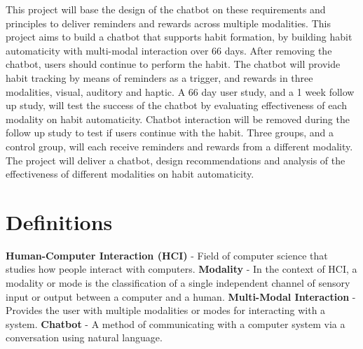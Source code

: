 This project will base the design of the chatbot on these requirements and principles to deliver reminders and rewards across multiple modalities.\newline
\newline
This project aims to build a chatbot that supports habit formation, by building habit automaticity with multi-modal interaction over 66 days. After removing the chatbot, users should continue to perform the habit. The chatbot will provide habit tracking by means of reminders as a trigger, and rewards in three modalities, visual, auditory and haptic. A 66 day user study, and a 1 week follow up study, will test the success of the chatbot by evaluating effectiveness of each modality on habit automaticity. Chatbot interaction will be removed during the follow up study to test if users continue with the habit. Three groups, and a control group, will each receive reminders and rewards from a different modality.\newline
\newline
The project will deliver a chatbot, design recommendations and analysis of the effectiveness of different modalities on habit automaticity.

\newpage

\section*{Definitions}

\textbf{Human-Computer Interaction (HCI)} - Field of computer science that studies how people interact with computers.\newline
\newline
\textbf{Modality} - In the context of HCI, a modality or mode is the classification of a single independent channel of sensory input or output between a computer and a human.\newline
\newline
\textbf{Multi-Modal Interaction} - Provides the user with multiple modalities or modes for interacting with a system.\newline
\newline
\textbf{Chatbot} - A method of communicating with a computer system via a conversation using natural language.

\newpage
